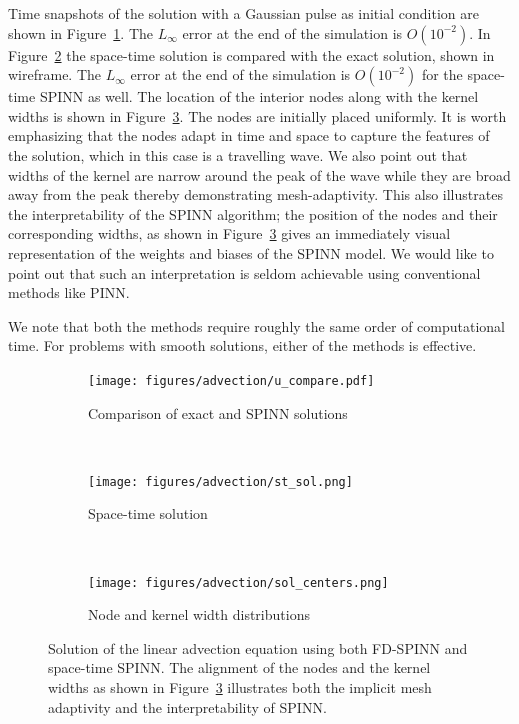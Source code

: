 \documentclass[12pt]{article}
\newcommand{\rr}[1]{#1}
\newcommand{\rb}[1]{#1}
\begin{document}
Time snapshots of the solution with a Gaussian pulse as initial condition are shown in Figure~\ref{fig:advection_comp}.  \rr{The $L_\infty$ error at the end of the simulation is $O(10^{-2})$.} In Figure~\ref{fig:advection_st} the space-time solution is compared with the exact solution, shown in wireframe. \rr{The $L_\infty$ error at the end of the simulation is $O(10^{-2})$ for the space-time SPINN as well.}  The location of the interior nodes along with the kernel widths is shown in Figure~\ref{fig:advection_nodes}.  The nodes are initially placed uniformly. It is worth emphasizing that the nodes adapt in time and space to capture the features of the solution, which in this case is a travelling wave. We also point out that widths of the kernel are narrow around the peak of the wave while they are broad away from the peak thereby demonstrating mesh-adaptivity. This also illustrates the interpretability of the SPINN algorithm; the position of the nodes and their corresponding widths, as shown in Figure~\ref{fig:advection_nodes} gives an immediately visual representation of the weights and biases of the SPINN model. We would like to point out that such an interpretation is seldom achievable using conventional methods like PINN.

\rb{We note that both the methods require roughly the same order of computational time.  For problems with smooth solutions, either of the methods is effective.}

\begin{figure}
\begin{subfigure}{0.32\textwidth}
\texttt{[image: figures/advection/u\_compare.pdf]}
\caption{Comparison of exact and SPINN solutions}
\label{fig:advection_comp}
\end{subfigure}
~
\begin{subfigure}{0.32\textwidth}
\texttt{[image: figures/advection/st\_sol.png]}
\caption{Space-time solution}
\label{fig:advection_st}
\end{subfigure}
~
\begin{subfigure}{0.32\textwidth}
\texttt{[image: figures/advection/sol\_centers.png]}
\caption{Node and kernel width distributions}
\label{fig:advection_nodes}
\end{subfigure}
\caption{Solution of the linear advection equation using both FD-SPINN and space-time SPINN. The alignment of the nodes and the kernel widths as shown in Figure~\ref{fig:advection_nodes} illustrates both the implicit mesh adaptivity and the interpretability of SPINN.}
\label{fig:linear_advection}
\end{figure}
\end{document}
